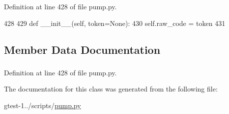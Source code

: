 \-Definition at line 428 of file pump.\-py.


\begin{DoxyCode}
428 
429   def __init__(self, token=None):
430     self.raw_code = token
431 

\end{DoxyCode}


\subsection{\-Member \-Data \-Documentation}
\hypertarget{classpump_1_1RawCodeNode_a8db72c4ea9ebfb2846099aabd030b415}{
\subsubsection[{raw\-\_\-code}]{}}\label{d3/df6/classpump_1_1RawCodeNode_a8db72c4ea9ebfb2846099aabd030b415}


\-Definition at line 428 of file pump.\-py.



\-The documentation for this class was generated from the following file\-:\begin{DoxyCompactItemize}
\item 
gtest-\/1../scripts/\hyperlink{pump_8py}{pump.\-py}\end{DoxyCompactItemize}
